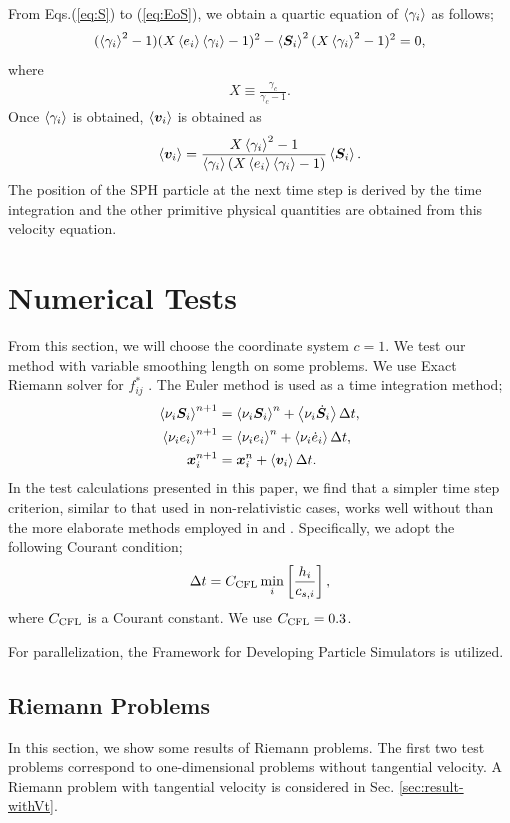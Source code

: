 \documentclass[]{aastex631}
\begin{document}
From Eqs.(\ref{eq:S}) to (\ref{eq:EoS}), we obtain a quartic equation of $\ev{\gamma_i}$ as follows;
\begin{align}
    (\ev{\gamma_i}^2-1)(X\ev{e_i}\ev{\gamma_i}-1)^2-\ev{\bm{S}_i}^2(X\ev{\gamma_i}^2-1)^2=0,
\end{align}
where
\begin{align}
    X\equiv \frac{\gamma_c}{\gamma_c-1}.
\end{align}
Once $\ev{\gamma_i}$ is obtained, $\ev{\bm{v}_i}$ is obtained as
\begin{align}
    \ev{\bm{v}_i}=\frac{X\ev{\gamma_i}^2-1}{\ev{\gamma_i}(X\ev{e_i}\ev{\gamma_i}-1)}\ev{\bm{S}_i}.
\end{align}
The position of the SPH particle at the next time step is derived by the time integration and the other primitive physical quantities are obtained from this velocity equation.

\section{Numerical Tests}
From this section, we will choose the coordinate system $c=1$.
We test our method with variable smoothing length on some problems.
We use Exact Riemann solver for $f^*_{ij}$ \citep{Pons_etal_2000}.
The Euler method is used as a time integration method;
\begin{align}
  \ev{\nu_i\bm{S}_i}^{n+1} &= \ev{\nu_i\bm{S}_i}^n + \ev{\nu_i\dot{\bm{S}}_i}\Delta t,\\
  \ev{\nu_ie_i}^{n+1} &= \ev{\nu_ie_i}^n + \ev{\nu_i\dot{e}_i}\Delta t,\\
  \bm{x}_i^{n+1} &= \bm{x}_i^{n} + \ev{\bm{v}_i}\Delta t.
\end{align}
In the test calculations presented in this paper, we find that a simpler time step criterion, similar to that used in non-relativistic cases, works well without than the more elaborate methods employed in \citep{Chow_Monaghan_1997} and \citep{Rosswog_2010}.
Specifically, we adopt the following Courant condition;
\begin{align}
  \Delta t = C_{\rm CFL}\min_i \left[\frac{h_i}{c_{s,i}}\right],
\end{align}
where $C_{\rm CFL}$ is a Courant constant.
We use $C_{\rm CFL} = 0.3$.



For parallelization, the Framework for Developing Particle Simulators \citep{Iwasawa+_2016} is utilized.

\subsection{Riemann Problems}
In this section, we show some results of Riemann problems.
The first two test problems correspond to one-dimensional problems without tangential velocity.
A Riemann problem with tangential velocity is considered in Sec. \ref{sec:result-withVt}. 
\end{document}
